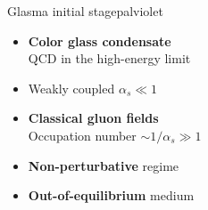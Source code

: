 \documentclass[aspectratio=169,11pt,usenames,dvipsnames]{beamer}
\begin{document}
\begin{frame}[noframenumbering]
\begin{columns}[onlytextwidth,t]
\begin{center}
\begin{custombox2}{Glasma initial stage}{palviolet}
\begin{varwidth}{0.76\textwidth}
\begin{itemize}
                    \item {\bfseries Color glass condensate}\\[1pt]
                        {\color{lightgray}\scriptsize QCD in the high-energy limit}
                    \item Weakly coupled $\alpha_s\ll 1$
                    \item {\bfseries Classical gluon fields}\\[1pt]
                        {\color{lightgray}\scriptsize Occupation number $\sim 1/\alpha_s\gg 1$}
                    \item {\bfseries Non-perturbative} regime
                    \item {\bfseries Out-of-equilibrium} medium
                    
                \end{itemize}
                \end{varwidth}
            \end{custombox2}


\end{center}
\end{columns}
\end{frame}
\end{document}
